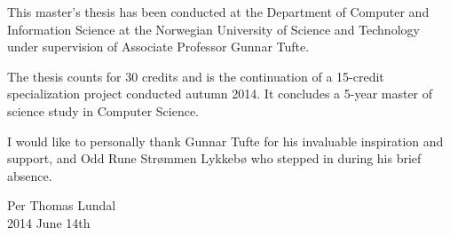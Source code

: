This master's thesis has been conducted at the Department of Computer and Information Science at the Norwegian University of Science and Technology under supervision of Associate Professor Gunnar Tufte.

The thesis counts for 30 credits and is the continuation of a 15-credit specialization project conducted autumn 2014.
It concludes a 5-year master of science study in Computer Science.

I would like to personally thank Gunnar Tufte for his invaluable inspiration and support, and Odd Rune Strømmen Lykkebø who stepped in during his brief absence.

\vspace{\fill}

\begin{flushright}
Per Thomas Lundal
\\
2014 June 14th
\end{flushright}
